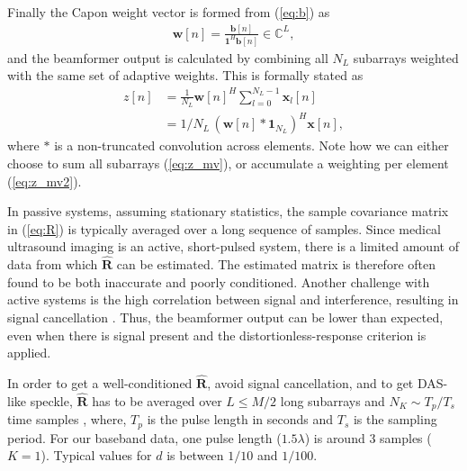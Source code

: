 \documentclass[journal]{IEEEtran}
\newcommand{\mat}[1]{\mathbf{#1}}
\renewcommand{\vec}[1]{\mathbf{#1}}
\begin{document}
Finally the Capon weight vector is formed from (\ref{eq:b}) as
\begin{align}\label{eq:w}
\vec{w}[n] = \frac{\vec{b}[n]}{\vec{1}^H\vec{b}[n]} \in \mathbb{C}^L,
\end{align}
and the beamformer output is calculated by combining all $N_L$ subarrays weighted with the same set of adaptive weights. This is formally stated as
\begin{align}
z[n] &= \frac{1}{N_L}\vec{w}[n]^H \sum_{l=0}^{N_L-1} \vec{x}_l[n] \label{eq:z_mv}\\
&= 1/N_L \, (\vec{w}[n] * \vec{1}_{N_L})^H\vec{x}[n] \label{eq:z_mv2},
\end{align}
where $*$ is a non-truncated convolution across elements.
Note how we can either choose to sum all subarrays (\ref{eq:z_mv}), or accumulate a weighting per element (\ref{eq:z_mv2}).

In passive systems, assuming stationary statistics, the sample covariance matrix in (\ref{eq:R}) is typically averaged over a long sequence of samples\cite{Krim1996}. Since medical ultrasound imaging is an active, short-pulsed system, there is a limited amount of data from which $\mat{\hat{R}}$ can be estimated. The estimated matrix is therefore often found to be both inaccurate and poorly conditioned. Another challenge with active systems is the high correlation between signal and interference, resulting in signal cancellation \cite{Reddy1987}. Thus, the beamformer output can be lower than expected, even when there is signal present and the distortionless-response criterion is applied. 

In order to get a well-conditioned $\mat{\hat{R}}$, avoid signal cancellation, and to get DAS-like speckle, $\mat{\hat{R}}$ has to be averaged over $L\le M/2$ long subarrays and $N_K \sim T_p/T_s$ time samples \cite{Synnevag2007a}, where, $T_p$ is the pulse length in seconds and $T_s$ is the sampling period. For our baseband data, one pulse length ($1.5\lambda$) is around 3 samples ($K=1$). Typical values for $d$ is between $1/10$ and $1/100$.
\end{document}
